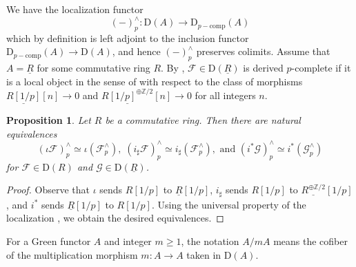 \documentclass[10pt]{amsart}
\newtheorem{prop}[thm]{Proposition}
\theoremstyle{definition}
\numberwithin{equation}{section}
\newcommand{\Z}{\mathbb{Z}}
\newcommand{\cF}{\mathcal{F}}
\newcommand{\cG}{\mathcal{G}}
\newcommand{\rD}{\mathrm{D}}
\newcommand{\ul}{\underline}
\newcommand{\comp}{\mathrm{comp}}
\begin{document}
We have the localization functor
\[
(-)_p^\wedge
\colon
\rD(A)
\to
\rD_{p-\comp}(A)
\]
which by definition is left adjoint to the inclusion functor
$\rD_{p-\comp}(A)\to \rD(A)$,
and hence $(-)_p^\wedge$ preserves colimits.
Assume that $A=\ul{R}$ for some commutative ring $R$.
By \cite[Corollary 7.3.2.2]{SAG},
$\cF\in \rD(\ul{R})$ is derived $p$-complete if it is a local object in the sense of \cite[Definition 5.5.4.1]{HTT} with respect to the class of morphisms $\ul{R[1/p]}[n]\to 0$ and $\ul{R[1/p]^{\oplus \Z/2}}[n]\to 0$ for all integers $n$.


\begin{prop}
\label{completioncommuteswith}
Let $R$ be a commutative ring.
Then there are natural equivalences
\[
(\iota \cF)_p^\wedge
\simeq
\iota (\cF_p^\wedge),
\;
(i_\sharp \cF)_p^\wedge
\simeq
i_\sharp (\cF_p^\wedge),
\text{ and }
(i^*\cG)_p^\wedge
\simeq
i^*(\cG_p^\wedge)
\]
for $\cF\in \rD(R)$ and $\cG\in \rD(\ul{R})$.
\end{prop}
\begin{proof}
Observe that $\iota$ sends $R[1/p]$ to $\ul{R}[1/p]$,
$i_\sharp$ sends $R[1/p]$ to $\ul{R^{\oplus \Z/2}}[1/p]$, and $i^*$ sends $\ul{R}[1/p]$ to $R[1/p]$.
Using the universal property of the localization \cite[Proposition 5.5.4.20]{HTT},
we obtain the desired equivalences.
\end{proof}


For a Green functor $A$ and integer $m\geq 1$,
the notation $A/mA$ means the cofiber of the multiplication morphism $m\colon A\to A$ taken in $\rD(A)$.
\end{document}
